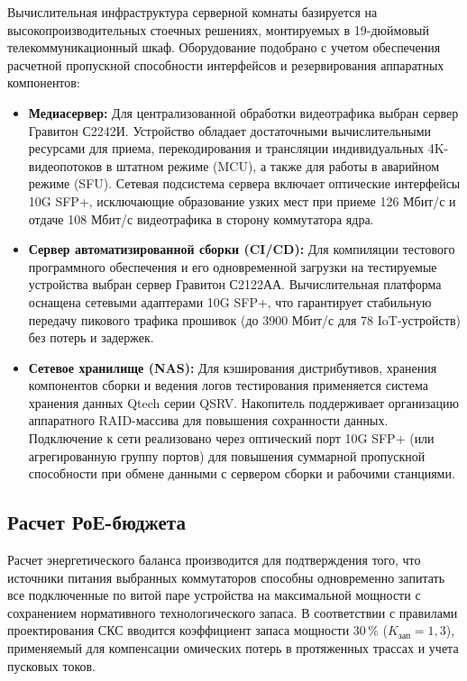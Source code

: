 \documentclass[a4paper,oneside,14pt]{extreport}
\begin{document}
Вычислительная инфраструктура серверной комнаты базируется на высокопроизводительных стоечных решениях, монтируемых в 19-дюймовый телекоммуникационный шкаф. Оборудование подобрано с учетом обеспечения расчетной пропускной способности интерфейсов и резервирования аппаратных компонентов:

\begin{itemize}
    \item \textbf{Медиасервер:} Для централизованной обработки видеотрафика выбран сервер Гравитон С2242И. Устройство обладает достаточными вычислительными ресурсами для приема, перекодирования и трансляции индивидуальных 4K-видеопотоков в штатном режиме (MCU), а также для работы в аварийном режиме (SFU). Сетевая подсистема сервера включает оптические интерфейсы 10G SFP+, исключающие образование узких мест при приеме 126 Мбит/с и отдаче 108 Мбит/с видеотрафика в сторону коммутатора ядра. 
    \item \textbf{Сервер автоматизированной сборки (CI/CD):} Для компиляции тестового программного обеспечения и его одновременной загрузки на тестируемые устройства выбран сервер Гравитон С2122АА. Вычислительная платформа оснащена сетевыми адаптерами 10G SFP+, что гарантирует стабильную передачу пикового трафика прошивок (до 3900 Мбит/с для 78 IoT-устройств) без потерь и задержек. 
    \item \textbf{Сетевое хранилище (NAS):} Для кэширования дистрибутивов, хранения компонентов сборки и ведения логов тестирования применяется система хранения данных Qtech серии QSRV. Накопитель поддерживает организацию аппаратного RAID-массива для повышения сохранности данных. Подключение к сети реализовано через оптический порт 10G SFP+ (или агрегированную группу портов) для повышения суммарной пропускной способности при обмене данными с сервером сборки и рабочими станциями.
\end{itemize}




\subsection{Расчет РоЕ-бюджета}

Расчет энергетического баланса производится для подтверждения того, что источники питания выбранных коммутаторов способны одновременно запитать все подключенные по витой паре устройства на максимальной мощности с сохранением нормативного технологического запаса. В соответствии с правилами проектирования СКС вводится коэффициент запаса мощности 30\,\% ($K_{\text{зап}} = 1{,}3$), применяемый для компенсации омических потерь в протяженных трассах и учета пусковых токов. 
\end{document}
